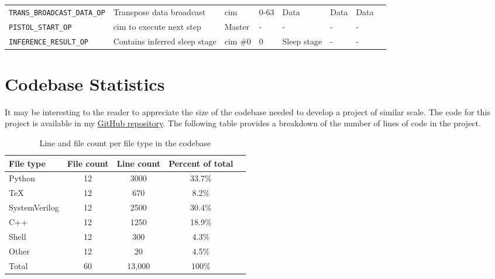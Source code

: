 \begin{sidewaystable}
\begin{tabular}{@{} p{6.5cm}lllllll @{}}
        \texttt{TRANS\_BROADCAST\_DATA\_OP}         & Transpose data broadcast          & \ac{cim}      & 0-63          & Data              & Data              & Data \\
        \texttt{PISTOL\_START\_OP}                  & \ac{cim} to execute next step     & Master        & -             & -                 & -                 & - \\
        \texttt{INFERENCE\_RESULT\_OP}              & Contains inferred sleep stage     & \ac{cim} \#0  & 0             & Sleep stage       & -                 & - \\
    \end{tabular}
    \label{tab:bus_ops}
\end{sidewaystable}

\section{Codebase Statistics}
It may be interesting to the reader to appreciate the size of the codebase needed to develop a project of similar scale. The code for this project is available 
in my \href{https://github.com/TristanRobitaille/engsci-thesis}{GitHub repository}. The following table provides a breakdown of the number of lines of code in the project.

\begin{table}[ht]
    \centering
    \renewcommand{\arraystretch}{1.2} %
    \setlength{\arrayrulewidth}{1.5pt} %
    \caption{Line and file count per file type in the codebase}
    \begin{tabular}{@{} p{4cm}cccr @{}}
        \toprule
        File type       & File count    & Line count    & Percent of total & \\\midrule
        Python          & 12            & 3000          & 33.7\% \\
        TeX             & 12            & 670           & 8.2\%  \\
        SystemVerilog   & 12            & 2500          & 30.4\% \\
        C++             & 12            & 1250          & 18.9\% \\
        Shell           & 12            & 300           & 4.3\%  \\
        Other           & 12            & 20            & 4.5\%  \\\midrule
        Total           & 60            & 13,000        & 100\%  \\
        \hline
    \end{tabular}
    \label{tab:line_cnt}
\end{table}

